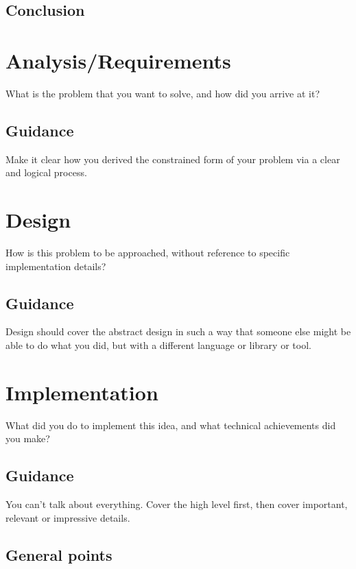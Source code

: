 \documentclass{l4proj}
\begin{document}
\section{Conclusion}

\chapter{Analysis/Requirements}
What is the problem that you want to solve, and how did you arrive at it?
\section{Guidance}
Make it clear how you derived the constrained form of your problem via a clear and logical process. 

\chapter{Design}
How is this problem to be approached, without reference to specific implementation details? 
\section{Guidance}
Design should cover the abstract design in such a way that someone else might be able to do what you did, but with a different language or library or tool.

\chapter{Implementation}
What did you do to implement this idea, and what technical achievements did you make?
\section{Guidance}
You can't talk about everything. Cover the high level first, then cover important, relevant or impressive details.



\section{General points}
\end{document}
